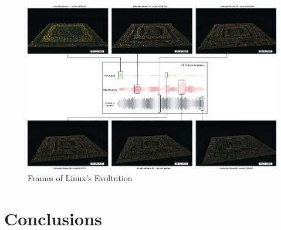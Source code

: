 \documentclass[11pt,twoside,english,singlespacing,headsepline,consistentlayout]{auxiliary/si-msc-thesis}
\begin{document}
\begin{landscape}
    \Huge 
    \begin{figure}[ht]
    \includegraphics[width=\linewidth]{LinuxAuralization.jpg}
    \caption{Frames of Linux's Evoltution} 
    \label{fig:Linux_V7}
\end{figure}

\end{landscape}

\section*{Conclusions}
\end{document}
